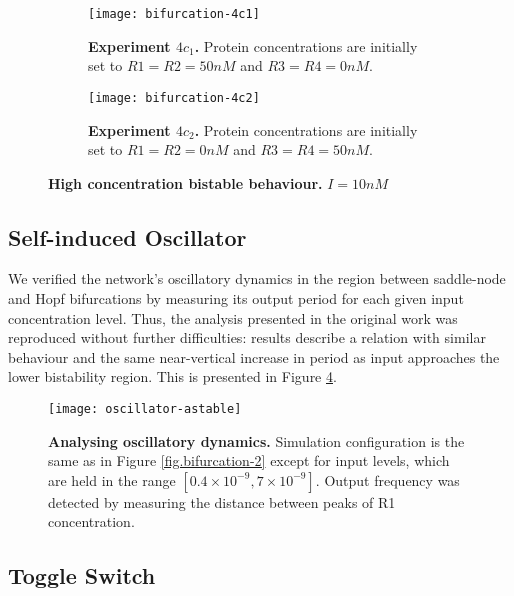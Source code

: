     \begin{figure}[!htb]
      \centering
      \begin{subfigure}[t]{0.4\textwidth}
        \centering
        \texttt{[image: bifurcation-4c1]}
        \caption{\textbf{Experiment $4c_{1}$.} Protein concentrations are initially set to $R1 = R2 = 50nM$ and $R3 = R4 = 0nM$.}
        \label{fig.bifurcation-4c1}
      \end{subfigure}
      \hspace{1em}
      \begin{subfigure}[t]{0.4\textwidth}
        \centering
        \texttt{[image: bifurcation-4c2]}
        \caption{\textbf{Experiment $4c_{2}$.} Protein concentrations are initially set to $R1 = R2 = 0nM$ and $R3 = R4 = 50nM$.}
        \label{fig.bifurcation-4c2}
      \end{subfigure}
      \caption{\textbf{High concentration bistable behaviour.} $I = 10 nM$}
      \label{fig.bifurcation-4}
    \end{figure}


  \subsection{Self-induced Oscillator}

    We verified the network's oscillatory dynamics in the region between saddle-node and Hopf bifurcations by measuring its output period for each given input concentration level.
    Thus, the analysis presented in the original work was reproduced without further difficulties: results describe a relation with similar behaviour and the same near-vertical increase in period as input approaches the lower bistability region.
    This is presented in Figure \ref{fig.oscillator-astable}. %

    \begin{figure}[!htb]
      \centering
      \texttt{[image: oscillator-astable]}
      \caption{\textbf{Analysing oscillatory dynamics.} Simulation configuration is the same as in Figure \ref{fig.bifurcation-2} except for input levels, which are held in the range $[0.4 \times 10^{-9}, 7 \times 10^{-9}]$. Output frequency was detected by measuring the distance between peaks of R1 concentration.}
      \label{fig.oscillator-astable}
    \end{figure}


  \subsection{Toggle Switch}

